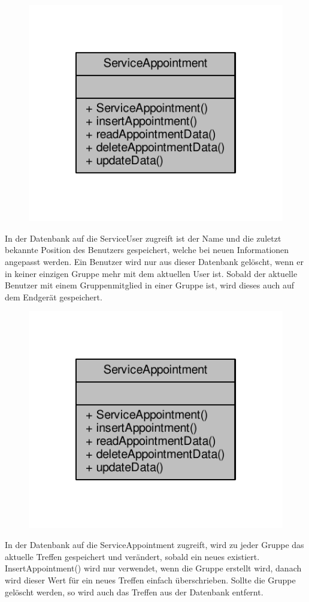 \begin{figure}[H]
	\includegraphics[scale = 1]{res/umlClasses/service_appointment__coll__graph.pdf}
	\centering
\end{figure}
In der Datenbank auf die ServiceUser zugreift ist der Name und die zuletzt bekannte Position des Benutzers gespeichert, welche bei neuen Informationen angepasst werden. 
Ein Benutzer wird nur aus dieser Datenbank gelöscht, wenn er in keiner einzigen Gruppe mehr mit dem aktuellen User ist.
Sobald der aktuelle Benutzer mit einem Gruppenmitglied in einer Gruppe ist, wird dieses auch auf dem Endgerät gespeichert.

\begin{figure}[H]
	\includegraphics[scale = 1]{res/umlClasses/service_appointment__coll__graph.pdf}
	\centering
\end{figure}
In der Datenbank auf die ServiceAppointment zugreift, wird zu jeder Gruppe das aktuelle Treffen gespeichert und verändert, sobald ein neues existiert. InsertAppointment() wird nur verwendet, wenn die Gruppe erstellt wird, danach wird dieser Wert für ein neues Treffen einfach überschrieben.
Sollte die Gruppe gelöscht werden, so wird auch das Treffen aus der Datenbank entfernt.

